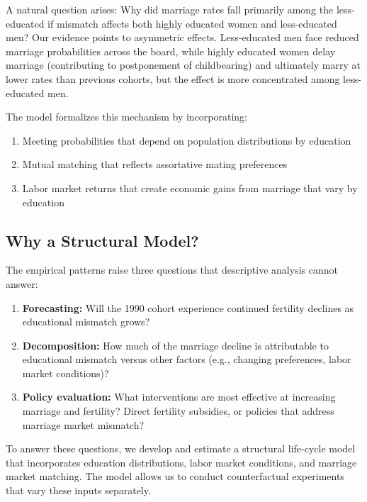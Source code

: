 \documentclass[12pt]{article}
\begin{document}
A natural question arises: Why did marriage rates fall primarily among the less-educated if mismatch affects both highly educated women and less-educated men? Our evidence points to asymmetric effects. Less-educated men face reduced marriage probabilities across the board, while highly educated women delay marriage (contributing to postponement of childbearing) and ultimately marry at lower rates than previous cohorts, but the effect is more concentrated among less-educated men.

The model formalizes this mechanism by incorporating:
\begin{enumerate}
    \item Meeting probabilities that depend on population distributions by education
    \item Mutual matching that reflects assortative mating preferences
    \item Labor market returns that create economic gains from marriage that vary by education
\end{enumerate}

\subsection{Why a Structural Model?}

The empirical patterns raise three questions that descriptive analysis cannot answer:

\begin{enumerate}
    \item \textbf{Forecasting:} Will the 1990 cohort experience continued fertility declines as educational mismatch grows?

    \item \textbf{Decomposition:} How much of the marriage decline is attributable to educational mismatch versus other factors (e.g., changing preferences, labor market conditions)?

    \item \textbf{Policy evaluation:} What interventions are most effective at increasing marriage and fertility? Direct fertility subsidies, or policies that address marriage market mismatch?
\end{enumerate}

To answer these questions, we develop and estimate a structural life-cycle model that incorporates education distributions, labor market conditions, and marriage market matching. The model allows us to conduct counterfactual experiments that vary these inputs separately.
\end{document}
